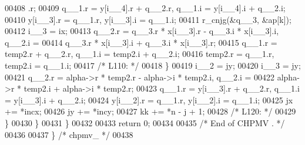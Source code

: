\begin{DoxyCode}
00408                 .r;
00409             q\_\_1.r = y[i\_\_4].r + q\_\_2.r, q\_\_1.i = y[i\_\_4].i + q\_\_2.i;
00410             y[i\_\_3].r = q\_\_1.r, y[i\_\_3].i = q\_\_1.i;
00411             r\_cnjg(&q\_\_3, &ap[k]);
00412             i\_\_3 = ix;
00413             q\_\_2.r = q\_\_3.r * x[i\_\_3].r - q\_\_3.i * x[i\_\_3].i, q\_\_2.i =
00414                  q\_\_3.r * x[i\_\_3].i + q\_\_3.i * x[i\_\_3].r;
00415             q\_\_1.r = temp2.r + q\_\_2.r, q\_\_1.i = temp2.i + q\_\_2.i;
00416             temp2.r = q\_\_1.r, temp2.i = q\_\_1.i;
00417 \textcolor{comment}{/* L110: */}
00418         \}
00419         i\_\_2 = jy;
00420         i\_\_3 = jy;
00421         q\_\_2.r = alpha->r * temp2.r - alpha->i * temp2.i, q\_\_2.i = 
00422             alpha->r * temp2.i + alpha->i * temp2.r;
00423         q\_\_1.r = y[i\_\_3].r + q\_\_2.r, q\_\_1.i = y[i\_\_3].i + q\_\_2.i;
00424         y[i\_\_2].r = q\_\_1.r, y[i\_\_2].i = q\_\_1.i;
00425         jx += *incx;
00426         jy += *incy;
00427         kk += *n - j + 1;
00428 \textcolor{comment}{/* L120: */}
00429         \}
00430     \}
00431     \}
00432 
00433     \textcolor{keywordflow}{return} 0;
00434 
00435 \textcolor{comment}{/*     End of CHPMV . */}
00436 
00437 \} \textcolor{comment}{/* chpmv\_ */}
00438 
\end{DoxyCode}
